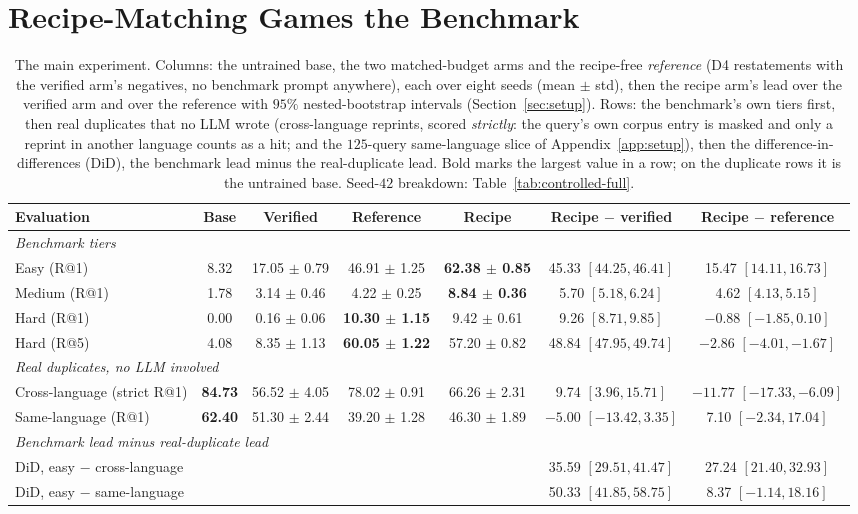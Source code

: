 \section{Recipe-Matching Games the Benchmark}
\label{sec:gaming}
\begin{table}[t]
\centering
\caption{The main experiment. Columns: the untrained base, the two matched-budget arms and the recipe-free \emph{reference} (D4 restatements with the verified arm's negatives, no benchmark prompt anywhere), each over eight seeds (mean $\pm$ std), then the recipe arm's lead over the verified arm and over the reference with $95\%$ nested-bootstrap intervals (Section~\ref{sec:setup}). Rows: the benchmark's own tiers first, then real duplicates that no LLM wrote (cross-language reprints, scored \emph{strictly}: the query's own corpus entry is masked and only a reprint in another language counts as a hit; and the $125$-query same-language slice of Appendix~\ref{app:setup}), then the difference-in-differences (DiD), the benchmark lead minus the real-duplicate lead. Bold marks the largest value in a row; on the duplicate rows it is the untrained base. Seed-$42$ breakdown: Table~\ref{tab:controlled-full}.}
\label{tab:controlled}
\scriptsize
\setlength{\tabcolsep}{2pt}
\renewcommand{\arraystretch}{0.90}
\begin{tabular}{lcccccc}
\toprule
Evaluation & Base & Verified & Reference & Recipe & Recipe $-$ verified & Recipe $-$ reference \\
\midrule
\multicolumn{7}{l}{\emph{Benchmark tiers}} \\
Easy (R@1)   & 8.32 & 17.05 $\pm$ 0.79 & 46.91 $\pm$ 1.25 & \textbf{62.38 $\pm$ 0.85} & 45.33 $[44.25, 46.41]$ & 15.47 $[14.11, 16.73]$ \\
Medium (R@1) & 1.78 & 3.14 $\pm$ 0.46  & 4.22 $\pm$ 0.25  & \textbf{8.84 $\pm$ 0.36}  & 5.70 $[5.18, 6.24]$    & 4.62 $[4.13, 5.15]$ \\
Hard (R@1)   & 0.00 & 0.16 $\pm$ 0.06  & \textbf{10.30 $\pm$ 1.15} & 9.42 $\pm$ 0.61  & 9.26 $[8.71, 9.85]$    & $-0.88$ $[-1.85, 0.10]$ \\
Hard (R@5)   & 4.08 & 8.35 $\pm$ 1.13  & \textbf{60.05 $\pm$ 1.22} & 57.20 $\pm$ 0.82 & 48.84 $[47.95, 49.74]$ & $-2.86$ $[-4.01, -1.67]$ \\
\multicolumn{7}{l}{\emph{Real duplicates, no LLM involved}} \\
Cross-language (strict R@1) & \textbf{84.73} & 56.52 $\pm$ 4.05 & 78.02 $\pm$ 0.91 & 66.26 $\pm$ 2.31 & 9.74 $[3.96, 15.71]$ & $-11.77$ $[-17.33, -6.09]$ \\
Same-language (R@1) & \textbf{62.40} & 51.30 $\pm$ 2.44 & 39.20 $\pm$ 1.28 & 46.30 $\pm$ 1.89 & $-5.00$ $[-13.42, 3.35]$ & 7.10 $[-2.34, 17.04]$ \\
\multicolumn{7}{l}{\emph{Benchmark lead minus real-duplicate lead}} \\
DiD, easy $-$ cross-language & & & & & 35.59 $[29.51, 41.47]$ & 27.24 $[21.40, 32.93]$ \\
DiD, easy $-$ same-language & & & & & 50.33 $[41.85, 58.75]$ & 8.37 $[-1.14, 18.16]$ \\
\bottomrule
\end{tabular}
\end{table}


